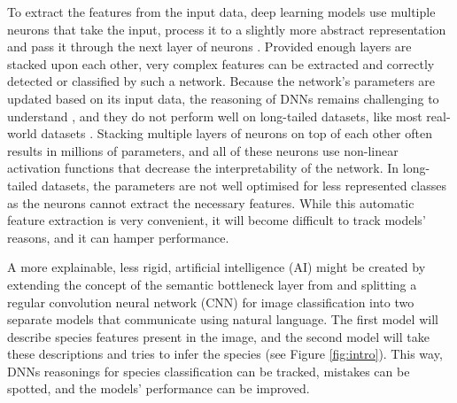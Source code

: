 \documentclass[a4paper, 12pt, oneside]{book} %
\begin{document}
To extract the features from the input data, deep learning models use multiple neurons that take the input, process it to a slightly more abstract representation and pass it through the next layer of neurons \autocite{schmidhuber_deep_2015}.
Provided enough layers are stacked upon each other, very complex features can be extracted and correctly detected or classified by such a network.
Because the network's parameters are updated based on its input data, the reasoning of DNNs remains challenging to understand \autocite{li_interpretable_2021, losch_interpretability_2019}, and they do not perform well on long-tailed datasets, like most real-world datasets \autocite{van_horn_inaturalist_2018}.
Stacking multiple layers of neurons on top of each other often results in millions of parameters, and all of these neurons use non-linear activation functions that decrease the interpretability of the network.
In long-tailed datasets, the parameters are not well optimised for less represented classes as the neurons cannot extract the necessary features.
While this automatic feature extraction is very convenient, it will become difficult to track models' reasons, and it can hamper performance.

A more explainable, less rigid, artificial intelligence (AI) might be created by extending the concept of the semantic bottleneck layer from \textcite{ishikawa_contextual_2021} and splitting a regular convolution neural network (CNN) for image classification into two separate models that communicate using natural language.
The first model will describe species features present in the image, and the second model will take these descriptions and tries to infer the species (see Figure \ref{fig:intro}).
This way, DNNs reasonings for species classification can be tracked, mistakes can be spotted, and the models' performance can be improved.
\end{document}
